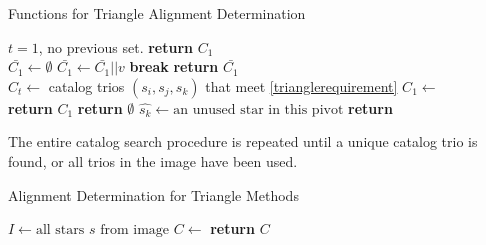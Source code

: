 \begin{algorithm}[H]
\caption{Functions for Triangle Alignment Determination} \label{Triangle Helpers}
\begin{algorithmic}[1]
 \Comment $t = 1$, no previous set.
\State \textbf{return} $C_1$ 
\EndIf
\\
\State $\bar{C_1} \gets \emptyset$ 
\State $\bar{C_1} \gets \bar{C_1} || v$
\State \textbf{break}
\EndIf
\EndFor
\EndFor
\State \textbf{return} $\bar{C_1}$
\EndFunction
\\

\State $C_t \gets $ catalog trios $(s_i, s_j, s_k)$ that meet \eqref{trianglerequirement}
\State $C_1 \gets $ 
\\

\State \textbf{return} $C_1$
\State \textbf{return} $\emptyset$
\Else
\State $\hat{s_k} \gets \text{an unused star in this pivot}$
\State \textbf{return} 
\EndIf
\EndFunction
\end{algorithmic}
\end{algorithm}

The entire catalog search procedure is repeated until a unique catalog trio is found, or all trios in the image have been used.

\begin{algorithm}[H]
\caption{Alignment Determination for Triangle Methods}
\label{Triangle Method}
\begin{algorithmic}[1]
\State $I \gets \text{all stars } s \text{ from image}$
\State $C \gets$ 
\State \textbf{return} $C$
\EndIf
\EndFor
\EndFor
\EndFor
\EndProcedure
\end{algorithmic}
\end{algorithm}

